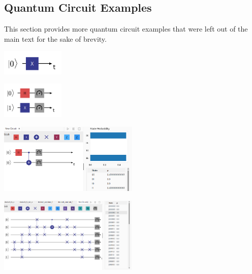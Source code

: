 \documentclass[conference]{IEEEtran}
\begin{document}
\begin{appendices}
\subsection{Quantum Circuit Examples}
\label{appendix:QuantumCircuitExamples}

This section provides more quantum circuit examples that were left out of the main text for the sake of brevity.


\centerline{
    \includegraphics[width=0.225\textwidth]{img/x-circuit.png}
}
\label{fig:singlequbitsinglegatecirquit}


\centerline{
    \includegraphics[width=0.225\textwidth]{img/single-gate-2-qubits-alt.png}
}
\label{fig:singlequbittwogatecirquit_alt}

\centerline{
    \includegraphics[width=0.5\textwidth]{img/multi-gate-bell-state-result.png}
}
\label{fig:controlledgate2qubitresult}

\centerline{
    \includegraphics[width=0.5\textwidth]{img/repeated_swapping_to_do_cnot_last_bits.png}
}
\label{fig:repeatedSwappingToDoCnotOnLastBits}



\end{appendices}
\end{document}
